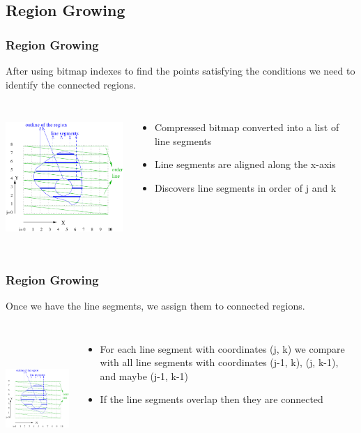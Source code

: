 \documentclass[11pt]{beamer}
\begin{document}
\subsection[Region Growing]{Region Growing}
\begin{frame}
	\frametitle{Region Growing}

	After using bitmap indexes to find the points satisfying the conditions we need to identify the connected regions.

	\pause
	\begin{columns}[c]
		\includegraphics[height=5cm]{example_grid.png}
		
		\begin{itemize}
			\item Compressed bitmap converted into a list of line segments
			\pause
			\item Line segments are aligned along the x-axis
			\pause
			\item Discovers line segments in order of j and k
		\end{itemize}
	\end{columns}
\end{frame}

\begin{frame}
	\frametitle{Region Growing}

	Once we have the line segments, we assign them to connected regions.
	\pause
	\begin{columns}[c]
		\includegraphics[height=5cm]{example_grid.png}
		
		\begin{itemize}
			\item For each line segment with coordinates (j, k) we compare with all line segments with coordinates (j-1, k), (j, k-1), and maybe (j-1, k-1)
			\pause
			\item If the line segments overlap then they are connected
		\end{itemize}
	\end{columns}
\end{frame}
\end{document}
